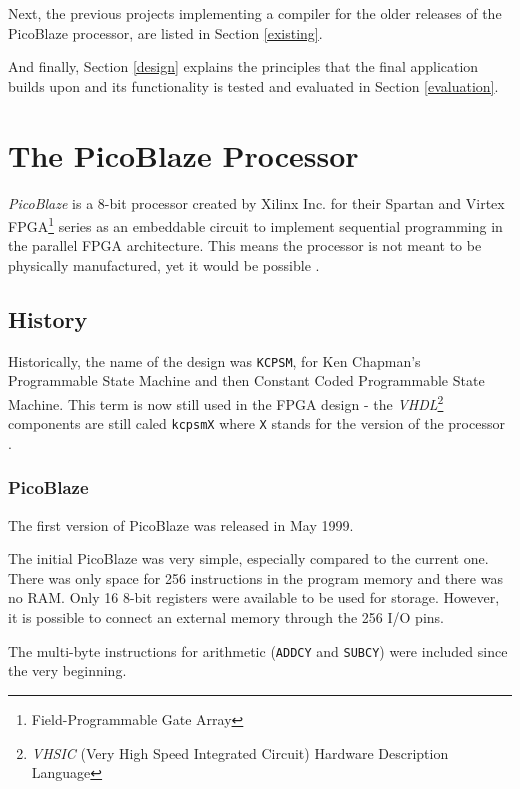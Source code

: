    Next, the previous projects implementing a compiler for the older releases of the PicoBlaze processor, are listed in Section \ref{existing}.

    And finally, Section \ref{design} explains the principles that the final application builds upon and its functionality is tested and evaluated in Section \ref{evaluation}.

\chapter{The PicoBlaze Processor}\label{processor}

\emph{PicoBlaze} is a 8-bit processor created by Xilinx Inc. for their Spartan and Virtex FPGA\footnote{Field-Programmable Gate Array} series as an embeddable circuit to implement sequential programming in the parallel FPGA architecture. This means the processor is not meant to be physically manufactured, yet it would be possible \cite{PicoBlazeWeb}.

    \section{History}

    Historically, the name of the design was \texttt{KCPSM}, for Ken Chapman's Programmable State Machine and then Constant Coded Programmable State Machine. This term is now still used in the FPGA design - the \emph{VHDL}\footnote{\emph{VHSIC} (Very High Speed Integrated Circuit) Hardware Description Language} components are still caled \texttt{kcpsmX} where \texttt{X} stands for the version of the processor \cite{DSPwFPGA}.

        \subsection{PicoBlaze}

        The first version of PicoBlaze was released in May 1999.

        The initial PicoBlaze was very simple, especially compared to the current one. There was only space for 256 instructions in the program memory and there was no RAM. Only 16 8-bit registers were available to be used for storage. However, it is possible to connect an external memory through the 256 I/O pins.

        The multi-byte instructions for arithmetic (\texttt{ADDCY} and \texttt{SUBCY}) were included since the very beginning.

